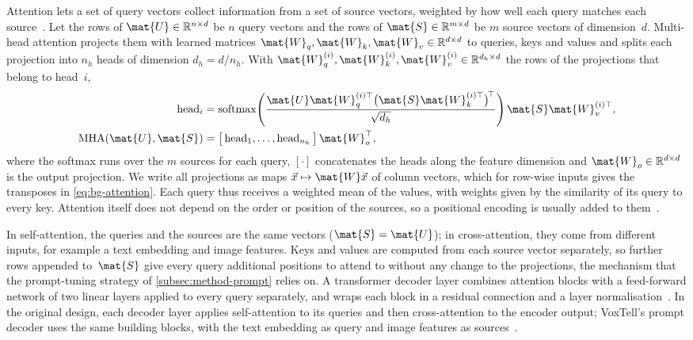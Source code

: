 Attention lets a set of query vectors collect information from a set of source vectors, weighted by how well each query matches each source~\cite{NIPS2017_3f5ee243}.
Let the rows of $\mat{U} \in \mathbb{R}^{n \times d}$ be $n$ query vectors and the rows of $\mat{S} \in \mathbb{R}^{m \times d}$ be $m$ source vectors of dimension~$d$.
Multi-head attention projects them with learned matrices $\mat{W}_q, \mat{W}_k, \mat{W}_v \in \mathbb{R}^{d \times d}$ to queries, keys and values and splits each projection into $n_h$ heads of dimension $d_h = d / n_h$.
With $\mat{W}_q^{(i)}, \mat{W}_k^{(i)}, \mat{W}_v^{(i)} \in \mathbb{R}^{d_h \times d}$ the rows of the projections that belong to head~$i$,
\begin{equation}
\begin{aligned}
\operatorname{head}_i &= \operatorname{softmax}\!\left( \frac{\mat{U}\mat{W}_q^{(i)\top} \big(\mat{S}\mat{W}_k^{(i)\top}\big)^{\!\top}}{\sqrt{d_h}} \right) \mat{S}\mat{W}_v^{(i)\top},\\
\operatorname{MHA}(\mat{U}, \mat{S}) &= \big[\operatorname{head}_1, \dots, \operatorname{head}_{n_h}\big]\, \mat{W}_o^{\top},
\end{aligned}
\label{eq:bg-attention}
\end{equation}
where the softmax runs over the $m$ sources for each query, $[\cdot]$ concatenates the heads along the feature dimension and $\mat{W}_o \in \mathbb{R}^{d \times d}$ is the output projection.
We write all projections as maps $\vec{x} \mapsto \mat{W}\vec{x}$ of column vectors, which for row-wise inputs gives the transposes in \cref{eq:bg-attention}.
Each query thus receives a weighted mean of the values, with weights given by the similarity of its query to every key.
Attention itself does not depend on the order or position of the sources, so a positional encoding is usually added to them~\cite{NIPS2017_3f5ee243}.

In self-attention, the queries and the sources are the same vectors ($\mat{S} = \mat{U}$); in cross-attention, they come from different inputs, for example a text embedding and image features.
Keys and values are computed from each source vector separately, so further rows appended to~$\mat{S}$ give every query additional positions to attend to without any change to the projections, the mechanism that the prompt-tuning strategy of \cref{subsec:method-prompt} relies on.
A transformer decoder layer combines attention blocks with a feed-forward network of two linear layers applied to every query separately, and wraps each block in a residual connection and a layer normalisation~\cite{NIPS2017_3f5ee243}.
In the original design, each decoder layer applies self-attention to its queries and then cross-attention to the encoder output; VoxTell's prompt decoder uses the same building blocks, with the text embedding as query and image features as sources~\cite[Eq.~3]{rokuss2025voxtellfreetextpromptableuniversal}.

